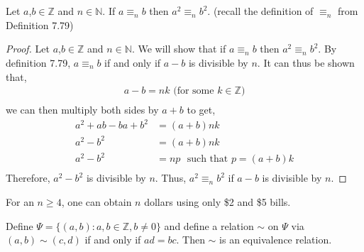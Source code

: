 \documentclass[12pt]{article}
\newenvironment{theorem}[2][Theorem]{\begin{trivlist}
\item[\hskip \labelsep {\bfseries #1}\hskip \labelsep {\bfseries #2.}]}{\end{trivlist}}
\begin{document}
\section{}
\begin{theorem}{4 (complete but seems wrong)}
	Let $a$,$b \in \mathbb{Z}$ and $n \in \mathbb{N}$. If $a \equiv_n b$ then $a^2 \equiv_n b^2$. (recall the definition of $\equiv_n$ from Definition 7.79)
	\end{theorem}

	\begin{proof}
	Let $a$,$b \in \mathbb{Z}$ and $n \in \mathbb{N}$. We will show that if $a \equiv_n b$ then $a^2 \equiv_n b^2$.
	By definition 7.79, $a \equiv_n b$ if and only if $a-b$ is divisible by $n$. It can thus be shown that,
	\begin{align*}
		a-b=nk \text{ (for some $k \in \mathbb{Z}$)}\\
	\end{align*}
	we can then multiply both sides by $a+b$ to get,
	\begin{align*}
		a^2+ab-ba+b^2&=(a+b)nk\\
		a^2-b^2&=(a+b)nk\\
		a^2-b^2&=np \text{  }\boxed{\text{such that $p=(a+b)k$}}\\
	\end{align*}
	Therefore, $a^2-b^2$ is divisible by $n$. 
	Thus, $a^2 \equiv_n b^2$ if $a-b$ is divisible by $n$.
\end{proof}

\begin{theorem}5
	For an $n \geq 4$, one can obtain $n$ dollars using only \$2 and \$5 bills.
\end{theorem}
\begin{theorem}{6 (complete)} 
	Define $\Psi = \{(a,b): a,b \in \mathbb{Z}, b\neq 0\}$ and define a relation $\sim$ on $\Psi$ via $(a,b) \sim (c,d)$ if and only if
	$ad=bc$. Then $\sim$ is an equivalence relation.\\
\end{theorem}
\end{document}
